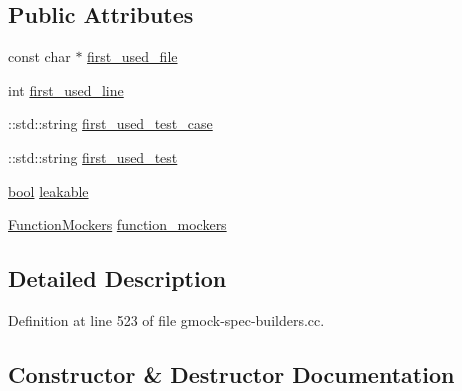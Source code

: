 \subsection*{Public Attributes}
\begin{DoxyCompactItemize}
\item 
const char $\ast$ \hyperlink{structtesting_1_1anonymous__namespace_02gmock-spec-builders_8cc_03_1_1MockObjectState_a7e11d3931573056a80f4069f4c27ca8f}{first\+\_\+used\+\_\+file}
\item 
int \hyperlink{structtesting_1_1anonymous__namespace_02gmock-spec-builders_8cc_03_1_1MockObjectState_a15222fe755889cc980f00448ca5ad099}{first\+\_\+used\+\_\+line}
\item 
\+::std\+::string \hyperlink{structtesting_1_1anonymous__namespace_02gmock-spec-builders_8cc_03_1_1MockObjectState_a4446fa6230645010c4bfe2b3a22330cf}{first\+\_\+used\+\_\+test\+\_\+case}
\item 
\+::std\+::string \hyperlink{structtesting_1_1anonymous__namespace_02gmock-spec-builders_8cc_03_1_1MockObjectState_acc6a146020fd74f9926c537ee9b1cf50}{first\+\_\+used\+\_\+test}
\item 
\hyperlink{classbool}{bool} \hyperlink{structtesting_1_1anonymous__namespace_02gmock-spec-builders_8cc_03_1_1MockObjectState_ab29ca1bf3d5dc51cbee32e48c4dff4ee}{leakable}
\item 
\hyperlink{namespacetesting_1_1anonymous__namespace_02gmock-spec-builders_8cc_03_abf8c9e1e1f8466bdd16e9f399af53be3}{Function\+Mockers} \hyperlink{structtesting_1_1anonymous__namespace_02gmock-spec-builders_8cc_03_1_1MockObjectState_aea43feb1cd8f47b20ca17b69d893d285}{function\+\_\+mockers}
\end{DoxyCompactItemize}


\subsection{Detailed Description}


Definition at line 523 of file gmock-\/spec-\/builders.\+cc.



\subsection{Constructor \& Destructor Documentation}
\mbox{\label{structtesting_1_1anonymous__namespace_02gmock-spec-builders_8cc_03_1_1MockObjectState_a1cbe3e1f878f959091d0d0b0ec40fa45}} 
